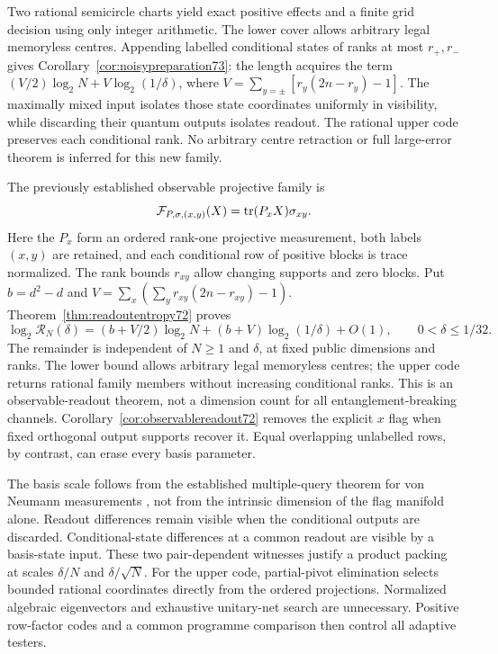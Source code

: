 Two rational semicircle charts yield exact positive effects and a
finite grid decision using only integer arithmetic. The lower cover
allows arbitrary legal memoryless centres. Appending labelled
conditional states of ranks at most $r_+,r_-$ gives
Corollary~\ref{cor:noisypreparation73}: the length acquires the term
$(V/2)\log_2N+V\log_2(1/\delta)$, where
$V=\sum_{y=\pm}[r_y(2n-r_y)-1]$.
The maximally mixed input isolates those state coordinates uniformly
in visibility, while discarding their quantum outputs isolates readout.
The rational upper code preserves each conditional rank. No arbitrary
centre retraction or full large-error theorem is inferred for this
new family.

The previously established observable projective family is
\[
 \mathcal F_{P,\sigma,(x,y)}(X)=\operatorname{tr}(P_xX)\sigma_{xy}.
\]
Here the $P_x$ form an ordered rank-one projective measurement, both
labels $(x,y)$ are retained, and each conditional row of positive
blocks is trace normalized. The rank bounds $r_{xy}$ allow changing
supports and zero blocks. Put $b=d^2-d$ and
$V=\sum_x(\sum_y r_{xy}(2n-r_{xy})-1)$.
Theorem~\ref{thm:readoutentropy72} proves
\[
 \log_2\mathcal R_N(\delta)
  =(b+V/2)\log_2N+(b+V)\log_2(1/\delta)+O(1),
 \qquad 0<\delta\le1/32.
\]
The remainder is independent of $N\ge1$ and $\delta$, at fixed
public dimensions and ranks. The lower bound allows arbitrary legal
memoryless centres; the upper code returns rational family members
without increasing conditional ranks. This is an observable-readout
theorem, not a dimension count for all entanglement-breaking channels.
Corollary~\ref{cor:observablereadout72} removes the explicit $x$ flag
when fixed orthogonal output supports recover it. Equal overlapping
unlabelled rows, by contrast, can erase every basis parameter.

The basis scale follows from the established multiple-query theorem
for von Neumann measurements \cite{PPKKO72}, not from the intrinsic
dimension of the flag manifold alone. Readout differences remain
visible when the conditional outputs are discarded. Conditional-state
differences at a common readout are visible by a basis-state input.
These two pair-dependent witnesses justify a product packing at scales
$\delta/N$ and $\delta/\sqrt N$. For the upper code, partial-pivot
elimination selects bounded rational coordinates directly from the
ordered projections. Normalized algebraic eigenvectors and exhaustive
unitary-net search are unnecessary. Positive row-factor codes and a
common programme comparison then control all adaptive testers.

